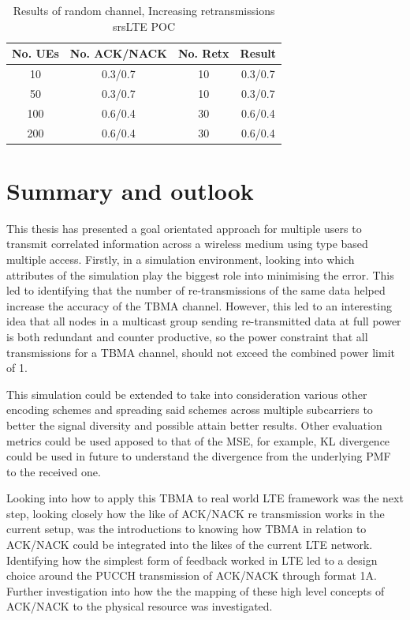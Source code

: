 \documentclass{article}
\begin{document}
\begin{table}[H]
    \centering
 \begin{tabular}{||c c c c||} 
 \hline
 No. UEs & No. ACK/NACK & No. Retx & Result \\ [0.5ex] 
 \hline\hline
 10 & 0.3/0.7 & 10 &  0.3/0.7 \\ 
 \hline
 50 & 0.3/0.7 & 10 & 0.3/0.7 \\
 \hline
 100 & 0.6/0.4 & 30 & 0.6/0.4 \\
 \hline
 200 & 0.6/0.4 & 30 & 0.6/0.4 \\ [1ex] 
 \hline
\end{tabular}
    \caption{Results of random channel, Increasing retransmissions srsLTE POC}
    \label{tab:rand_chan_rtx_increase}
\end{table}


\section{Summary and outlook}\label{summary_out}

This thesis has presented a goal orientated approach for multiple users to transmit correlated information across a wireless medium using type based multiple access. Firstly, in a simulation environment, looking into which attributes of the simulation play the biggest role into minimising the error. This led to identifying that the number of re-transmissions of the same data helped increase the accuracy of the TBMA channel. However, this led to an interesting idea that all nodes in a multicast group sending re-transmitted data at full power is both redundant and counter productive, so the power constraint that all transmissions for a TBMA channel, should not exceed the combined power limit of 1.

This simulation could be extended to take into consideration various other encoding schemes and spreading said schemes across multiple subcarriers to better the signal diversity and possible attain better results. Other evaluation metrics could be used apposed to that of the MSE, for example, KL divergence could be used in future to understand the divergence from the underlying PMF to the received one.  

Looking into how to apply this TBMA to real world LTE framework was the next step, looking closely how the like of ACK/NACK re transmission works in the current setup, was the introductions to knowing how TBMA in relation to ACK/NACK could be integrated into the likes of the current LTE network. Identifying how the simplest form of feedback worked in LTE led to a design choice around the PUCCH transmission of ACK/NACK through format 1A. Further investigation into how the the  mapping of these high level concepts of ACK/NACK to the physical resource was investigated. 
\end{document}
